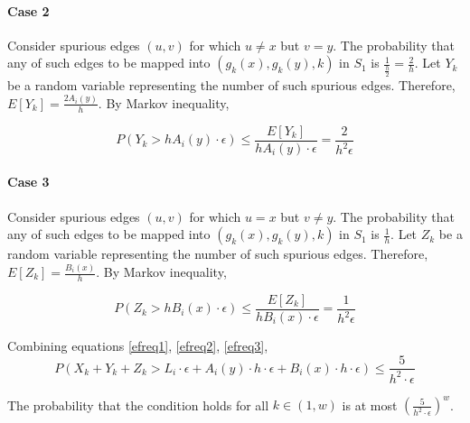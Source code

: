 \paragraph{Case 2} Consider spurious edges $(u,v)$ for which $u \neq x$ but $v=y$. The probability that any of such edges to be mapped into $(g_k(x),g_k(y),k)$ in $S_1$ is $\frac{1}{\frac{h}{2}} = \frac{2}{h}$. Let $Y_k$ be a random variable representing the number of such spurious edges. Therefore, $E[Y_k] = \frac{2A_i(y)}{h}$. By Markov inequality,

\begin{equation} \label{efreq2}
P(Y_k > h A_i(y) \cdot \epsilon) \leq \frac{E[Y_k]}{h A_i(y) \cdot \epsilon} = \frac{2}{h^2\epsilon}
\end{equation}

\paragraph{Case 3} Consider spurious edges $(u,v)$ for which $u=x$ but $v \neq y$. The probability that any of such edges to be mapped into $(g_k(x),g_k(y),k)$ in $S_1$ is $\frac{1}{h}$. Let $Z_k$ be a random variable representing the number of such spurious edges. Therefore, $E[Z_k] = \frac{B_i(x)}{h}$. By Markov inequality,

\begin{equation} \label{efreq3}
P(Z_k > h B_i(x) \cdot \epsilon) \leq \frac{E[Z_k]}{h B_i(x) \cdot \epsilon} = \frac{1}{h^2\epsilon}
\end{equation}

Combining equations \ref{efreq1}, \ref{efreq2}, \ref{efreq3},
\begin{equation}
  P(X_k + Y_k + Z_k > L_i \cdot \epsilon + A_i(y) \cdot h \cdot \epsilon + B_i(x) \cdot h \cdot \epsilon) \leq \frac{5}{h^2\cdot\epsilon}
\end{equation}

The probability that the condition holds for all $k \in (1,w)$ is at most $(\frac{5}{h^2\cdot\epsilon})^w$.

